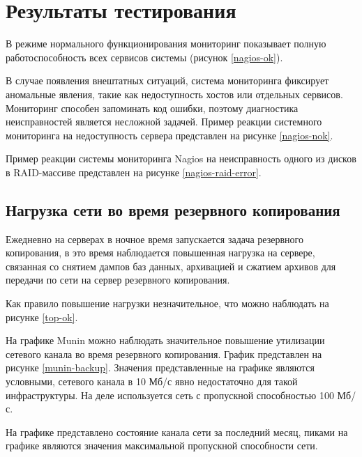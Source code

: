 \section{Результаты тестирования}

В режиме нормального функционирования мониторинг показывает полную работоспособность всех сервисов системы (рисунок \ref{nagios-ok}).

В случае появления внештатных ситуаций, система мониторинга фиксирует аномальные явления, такие как недоступность хостов или отдельных сервисов.
Мониторинг способен запоминать код ошибки, поэтому диагностика неисправностей является несложной задачей.
Пример реакции системного мониторинга на недоступность сервера представлен на рисунке \ref{nagios-nok}.

Пример реакции системы мониторинга Nagios на неисправность одного из дисков в RAID-массиве представлен на рисунке \ref{nagios-raid-error}.

\subsection{Нагрузка сети во время резервного копирования}

Ежедневно на серверах в ночное время запускается задача резервного копирования, в это время наблюдается повышенная нагрузка на сервере, связанная со снятием дампов баз данных, архивацией и сжатием архивов для передачи по сети на сервер резервного копирования.

Как правило повышение нагрузки незначительное, что можно наблюдать на рисунке \ref{top-ok}.

На графике Munin можно наблюдать значительное повышение утилизации сетевого канала во время резервного копирования.
График представлен на рисунке \ref{munin-backup}.
Значения представленные на графике являются условными, сетевого канала в 10 Мб/с явно недостаточно для такой инфраструктуры.
На деле используется сеть с пропускной способностью 100 Мб/с.

На графике представлено состояние канала сети за последний месяц, пиками на графике являются значения максимальной пропускной способности сети.

